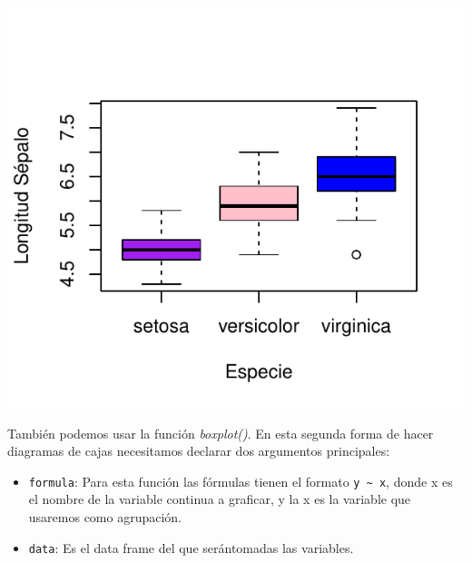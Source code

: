 \documentclass[
]{book}
\newenvironment{Shaded}{\begin{snugshade}}{\end{snugshade}}
\newcommand{\AttributeTok}[1]{\textcolor[rgb]{0.13,0.29,0.53}{#1}}
\newcommand{\FunctionTok}[1]{\textcolor[rgb]{0.13,0.29,0.53}{\textbf{#1}}}
\newcommand{\NormalTok}[1]{#1}
\newcommand{\SpecialCharTok}[1]{\textcolor[rgb]{0.81,0.36,0.00}{\textbf{#1}}}
\newcommand{\StringTok}[1]{\textcolor[rgb]{0.31,0.60,0.02}{#1}}
\begin{document}
\begin{Shaded}
\end{Shaded}

\begin{center}\includegraphics{_main_files/figure-latex/unnamed-chunk-194-1} \end{center}

También podemos usar la función \emph{boxplot()}.
En esta segunda forma de hacer diagramas de cajas necesitamos declarar dos argumentos principales:

\begin{itemize}
\item
  \texttt{formula}: Para esta función las fórmulas tienen el formato \texttt{y\ \textasciitilde{}\ x}, donde x es el nombre de la variable continua a graficar, y la x es la variable que usaremos como agrupación.
\item
  \texttt{data}: Es el data frame del que serántomadas las variables.
\end{itemize}
\end{document}
